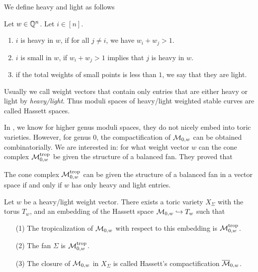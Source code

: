     We define heavy and light as follows 
    \begin{definition}
    \label{def:heavy-light}
    Let $w \in \mathbb{Q}^n$. Let $i \in [n]$.
    \begin{enumerate}
        \item $i$ is heavy in $w$, if for all $j \ne i$,
            we have $w_i + w_j > 1$. 
        \item $i$ is small in $w$, if $w_i + w_j > 1$ implies that $j$ is heavy in $w$. 
        \item if the total weights of small points is less than $1$,
        we say that they are light. 
    \end{enumerate}
    \end{definition}
    Usually we call weight vectors that contain only entries that are either heavy or light by \emph{heavy/light}. 
    Thus moduli spaces of heavy/light weighted stable curves are called Hassett spaces. 
    
    In \citet{Cavalieri2014}, we know for higher genus moduli spaces,
    they do not nicely embed into toric varieties. 
    However, for genus $0$, the compactification of $\mathcal{M}_{0, w}$ can be obtained combinatorially. 
    We are interested in: for what weight vector $w$ can 
    the cone complex $\mathcal{M}_{0, w}^{\operatorname{trop}}$ be given the structure of a balanced fan.
    They proved that 
    \begin{theorem}
    	The cone complex $\mathcal{M}_{0, w}^{\operatorname{trop}}$ can be given the structure of a balanced fan 
	    in a vector space if and only if $w$ has only heavy and light entries. 
    \end{theorem} 
    
    \begin{theorem}
    	Let $w$ be a heavy/light weight vector.
	    There exists a toric variety $X_\Sigma$ with the torus $T_w$,
    	and an embedding of the Hassett space 
	    $\mathcal{M}_{0, w} \hookrightarrow T_w$
	    such that 
	    \begin{enumerate}
		    \item[(1)] The         tropicalization of $\mathcal{M}_{0, w}$ with respect to this embedding is 
			$\mathcal{M}_{0, w}^{\operatorname{trop}}$.
		    
		    \item[(2)]
			The fan $\Sigma$ is $\mathcal{M}_{0, w}^{\operatorname{trop}}$.
	    	
	    	\item[(3)]
			The closure of $\mathcal{M}_{0, w}$ in $X_\Sigma$ is called 
			Hassett's compactification $\overline{\mathcal{M}}_{0, w}$.
	\end{enumerate}
    \end{theorem}